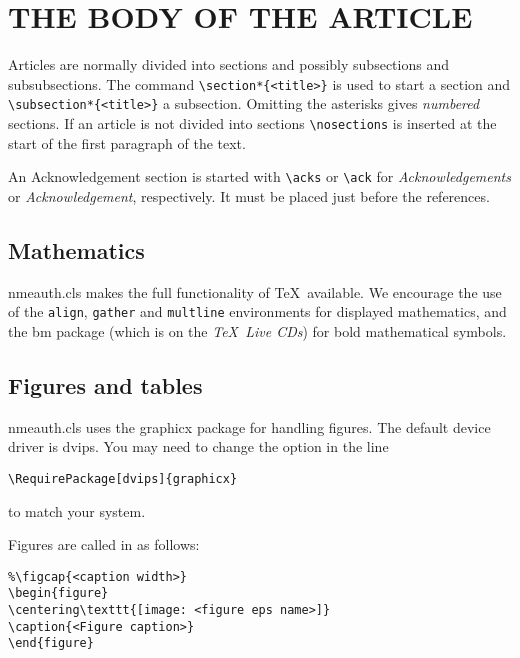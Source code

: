 \documentclass{nmeauth}
\begin{document}
\section{THE BODY OF THE ARTICLE}
Articles are normally divided into sections
and possibly subsections and subsubsections.
The command \verb"\section*{<title>}" is used to start a section
and \verb"\subsection*{<title>}" a subsection.
Omitting the asterisks gives \emph{numbered} sections.
If an article is not divided into sections \verb"\nosections" is inserted
at the start of the first paragraph of the text.

An Acknowledgement section is started with \verb"\acks" or \verb"\ack"
for \textit{Acknowledgements} or \textit{Acknowledgement}, respectively.
It must be placed just before the references.

\subsection{Mathematics}
\textsf{nmeauth.cls} makes the full functionality of \AmS\/\TeX\ available.
We encourage the use of the \verb"align", \verb"gather" and \verb"multline"
environments for displayed mathematics, and the \textsf{bm} package (which is on
the \emph{\TeX\ Live CDs}) for bold mathematical symbols.

\subsection{Figures and tables}
\textsf{nmeauth.cls} uses the \textsf{graphicx} package for handling figures.
The default device driver is \textsf{dvips}.
You may need to change the option in the line
\begin{verbatim}
\RequirePackage[dvips]{graphicx}
\end{verbatim}
to match your system.

Figures are called in as follows:
\begin{verbatim}
%\figcap{<caption width>}
\begin{figure}
\centering\texttt{[image: <figure eps name>]}
\caption{<Figure caption>}
\end{figure}
\end{verbatim}
\end{document}
